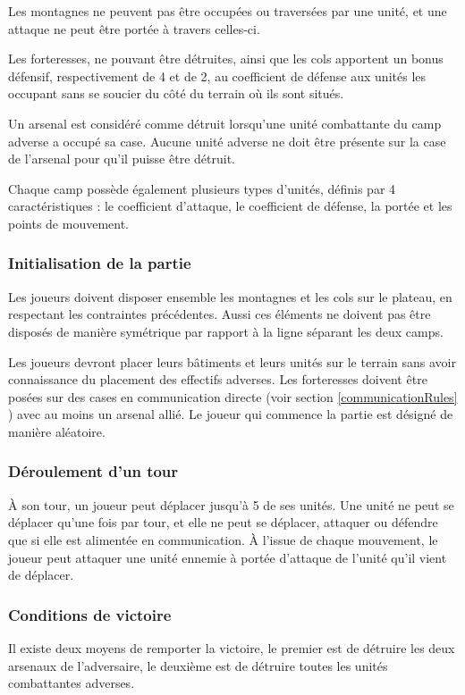 \documentclass[a4paper]{report}
\begin{document}
Les montagnes ne peuvent pas être occupées ou traversées par une unité, et une attaque ne peut être portée à travers celles-ci.

Les forteresses, ne pouvant être détruites, ainsi que les cols apportent un bonus défensif, respectivement de 4 et de 2, au coefficient de défense aux unités les occupant sans se soucier du côté du terrain où ils sont situés.

Un arsenal est considéré comme détruit lorsqu'une unité combattante du camp adverse a occupé sa case. Aucune unité adverse ne doit être présente sur la case de l'arsenal pour qu'il puisse être détruit.

Chaque camp possède également plusieurs types d'unités, définis par 4 caractéristiques : le coefficient d'attaque, le coefficient de défense, la portée et les points de mouvement.

\subsubsection*{Initialisation de la partie}

Les joueurs doivent disposer ensemble les montagnes et les cols sur le plateau, en respectant les contraintes précédentes. Aussi ces éléments ne doivent pas être disposés de manière symétrique par rapport à la ligne séparant les deux camps.

Les joueurs devront placer leurs bâtiments et leurs unités sur le terrain sans avoir connaissance du placement des effectifs adverses. Les forteresses doivent être posées sur des cases en communication directe (voir section \ref{communicationRules} ) avec au moins un arsenal allié.
Le joueur qui commence la partie est désigné de manière aléatoire.
 
\subsubsection*{Déroulement d'un tour}
\`A son tour, un joueur peut déplacer jusqu'à 5 de ses unités. Une unité ne peut se déplacer qu'une fois par tour, et elle ne peut se déplacer, attaquer ou défendre que si elle est alimentée en communication. À l'issue de chaque mouvement, le joueur peut attaquer une unité ennemie à portée d'attaque de l'unité qu'il vient de déplacer.

\subsubsection*{Conditions de victoire}
Il existe deux moyens de remporter la victoire, le premier est de détruire les deux arsenaux de l'adversaire, le deuxième est de détruire toutes les unités combattantes adverses.
\end{document}
